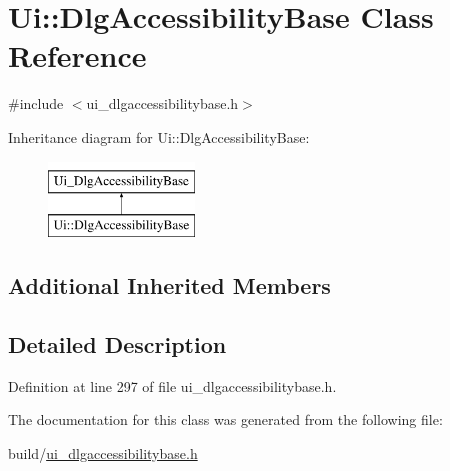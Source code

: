 \hypertarget{classUi_1_1DlgAccessibilityBase}{\section{Ui\+:\+:Dlg\+Accessibility\+Base Class Reference}
\label{classUi_1_1DlgAccessibilityBase}
}


{\ttfamily \#include $<$ui\+\_\+dlgaccessibilitybase.\+h$>$}

Inheritance diagram for Ui\+:\+:Dlg\+Accessibility\+Base\+:\begin{figure}[H]
\begin{center}
\leavevmode
\includegraphics[height=2.000000cm]{classUi_1_1DlgAccessibilityBase}
\end{center}
\end{figure}
\subsection*{Additional Inherited Members}


\subsection{Detailed Description}


Definition at line 297 of file ui\+\_\+dlgaccessibilitybase.\+h.



The documentation for this class was generated from the following file\+:\begin{DoxyCompactItemize}
\item 
build/\hyperlink{ui__dlgaccessibilitybase_8h}{ui\+\_\+dlgaccessibilitybase.\+h}\end{DoxyCompactItemize}
